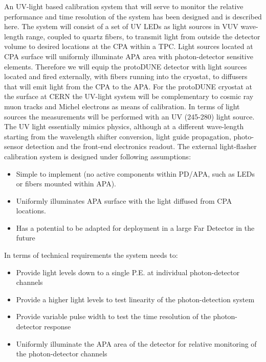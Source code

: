 An UV-light based calibration system that will serve to monitor the relative performance and time resolution of the system has been designed and is described here.
The system will consist of a set of UV LEDs as light sources in VUV wave-length range, coupled to quartz fibers, to transmit light from outside the detector volume to desired locations at the CPA within a TPC.
Light sources located at CPA surface will uniformly illuminate APA area with photon-detector sensitive elements. Therefore we will equip the protoDUNE detector with light sources located and fired externally, 
with fibers running into the cryostat, to diffusers that will emit light from the CPA to the APA. For the protoDUNE cryostat at the surface at CERN the UV-light system will be complementary to cosmic ray muon 
tracks and Michel electrons as means of calibration. In terms of light sources the measurements will be performed with an UV (245-280) light source. The UV light essentially mimics physics, although at a different 
wave-length starting from the wavelength shifter conversion, light guide propagation, photo-sensor detection and the front-end electronics readout.
	The external light-flasher calibration system is designed under following assumptions:
\begin{itemize}
\item Simple to implement (no active components within PD/APA, such as LEDs or fibers mounted within APA).
\item Uniformly illuminates APA surface with the light diffused from CPA locations.
\item Has a potential to be adapted for deployment in a large Far Detector in the future
\end{itemize}

	In terms of technical requirements the system needs to:
\begin{itemize}
\item Provide light levels down to a single P.E. at individual photon-detector channels
\item Provide a higher light levels to test linearity of the photon-detection system
\item Provide variable pulse width to test the time resolution of the photon-detector response
\item Uniformly illuminate the APA area of the detector for relative monitoring of the photon-detector channels
\end{itemize}

